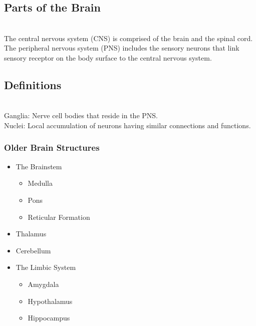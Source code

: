 \subsection{Parts of the Brain}
\\The central nervous system (CNS) is comprised of the brain and the spinal cord.
\\The peripheral nervous system (PNS) includes the sensory neurons that link sensory receptor on the body surface to the central nervous system.
\subsection{Definitions}
\\Ganglia: Nerve cell bodies that reside in the PNS.
\\Nuclei: Local accumulation of neurons having similar connections and functions.

\subsubsection{Older Brain Structures}

\begin{itemize}
    \item The Brainstem
    \begin{itemize}
        \item Medulla
        \item Pons
        \item Reticular Formation
        \end{itemize}
    \item Thalamus
    \item Cerebellum
    \item The Limbic System
    \begin{itemize}
        \item Amygdala
        \item Hypothalamus
        \item Hippocampus

    \end{itemize}
\end{itemize}

